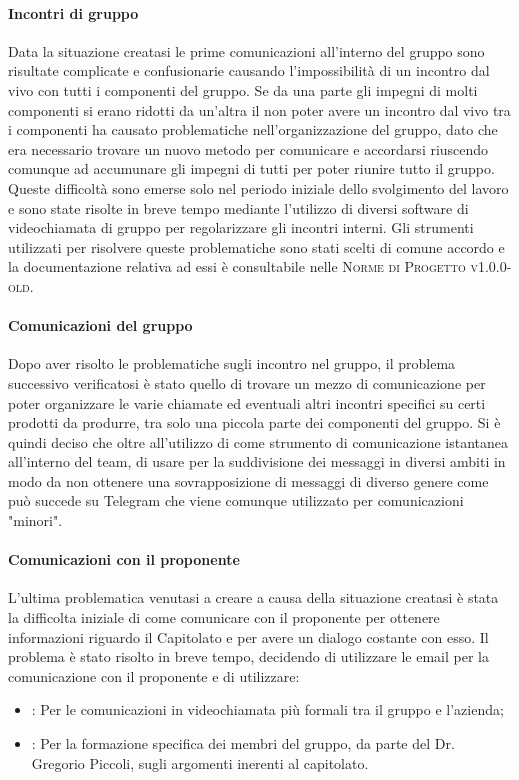 \documentclass[../piano-di-qualifica.tex]{subfiles}
\begin{document}
\paragraph{Incontri di gruppo}
\label{sub:incontri_di_gruppo}
Data la situazione creatasi le prime comunicazioni all'interno del gruppo sono risultate complicate e confusionarie causando l'impossibilità di un incontro dal vivo con tutti i componenti del gruppo.
Se da una parte gli impegni di molti componenti si erano ridotti da un'altra il non poter avere un incontro dal vivo tra i componenti ha causato problematiche nell'organizzazione del gruppo, dato che era necessario trovare un nuovo metodo per comunicare e accordarsi riuscendo comunque ad accumunare gli impegni di tutti per poter riunire tutto il gruppo.
Queste difficoltà sono emerse solo nel periodo iniziale dello svolgimento del lavoro e sono state risolte in breve tempo mediante l'utilizzo di diversi software di videochiamata di gruppo per regolarizzare gli incontri interni.
Gli strumenti utilizzati per risolvere queste problematiche sono stati scelti di comune accordo e la documentazione relativa ad essi è consultabile nelle \textsc{Norme di Progetto v1.0.0-old}.

\paragraph{Comunicazioni del gruppo}
\label{sub:comunicazione_del_gruppo}
Dopo aver risolto le problematiche sugli incontro nel gruppo, il problema successivo verificatosi è stato quello di trovare un mezzo di comunicazione per poter organizzare le varie chiamate ed eventuali altri incontri specifici su certi prodotti da produrre, tra solo una piccola parte dei componenti del gruppo.
Si è quindi deciso che oltre all'utilizzo di  come strumento di comunicazione istantanea all'interno del team, di usare  per la suddivisione dei messaggi in diversi ambiti in modo da non ottenere una sovrapposizione di messaggi di diverso genere come può succede su Telegram che viene comunque utilizzato per comunicazioni "minori".

\paragraph{Comunicazioni con il proponente}
\label{sub:comunicazione_con_il_proponente}
L'ultima problematica venutasi a creare a causa della situazione creatasi è stata la difficolta iniziale di come comunicare con il proponente per ottenere informazioni riguardo il Capitolato e per avere un dialogo costante con esso.
Il problema è stato risolto in breve tempo, decidendo di utilizzare le email per la comunicazione con il proponente e di utilizzare:
\begin{itemize}
    \item \textbf{}: Per le comunicazioni in videochiamata più formali tra il gruppo e l'azienda;
    \item \textbf{}: Per la formazione specifica dei membri del gruppo, da parte del Dr. Gregorio Piccoli, sugli argomenti inerenti al capitolato.
\end{itemize}
\end{document}
